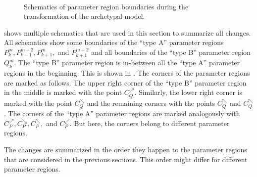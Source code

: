 \begin{figure}
{		\label{fig:add.change.schema.d}
	} \\
	\caption[Schematics of parameter region boundaries during the transformation of the archetypal model]{
		Schematics of parameter region boundaries during the transformation of the archetypal model.
	}
	\label{fig:add.change.schema}
\end{figure}

 shows multiple schematics that are used in this section to summarize all changes.
All schematics show some boundaries of the ``type A'' parameter regions $P^m_k, P^{m-2}_{k-1}, P^m_{k+1},$ and $P^{m+2}_{k+1}$ and all boundaries of the ``type B'' parameter region $Q^m_k$.
The ``type B'' parameter region is in-between all the ``type A'' parameter regions in the beginning.
This is shown in .
The corners of the parameter regions are marked as follows.
The upper right corner of the ``type B'' parameter region in the middle is marked with the point $C_Q^\nearrow$.
Similarly, the lower right corner is marked with the point $C_Q^\searrow$ and the remaining corners with the points $C_Q^\nwarrow$ and $C_Q^\nwarrow$.
The corners of the ``type A'' parameter regions are marked analogously with $C_P^\nearrow, C_P^\searrow, C_P^\nwarrow,$ and $C_P^\swarrow$.
But here, the corners belong to different parameter regions.

The changes are summarized in the order they happen to the parameter regions that are considered in the previous sections.
This order might differ for different parameter regions.

